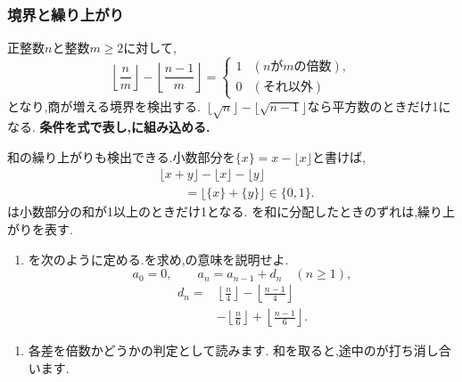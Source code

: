   \subsubsection{境界と繰り上がり}\label{節：ガウス型の境界と条件}
    正整数$n$と整数$m\ge2$に対して,
    \[
      \left\lfloor\frac nm\right\rfloor-
      \left\lfloor\frac{n-1}{m}\right\rfloor
      =\begin{cases}
         1 & (n\text{が}m\text{の倍数}),\\
         0 & (\text{それ以外})
       \end{cases}
    \]
    となり,商が増える境界を検出する.
    \,$\lfloor\sqrt n\rfloor-\lfloor\sqrt{n-1}\rfloor$なら平方数のときだけ1になる.
    \textbf{条件を式で表し,に組み込める.}

    和の繰り上がりも検出できる.小数部分を$\{x\}=x-\lfloor x\rfloor$と書けば,
    \begin{align*}
      &\lfloor x+y\rfloor-\lfloor x\rfloor-\lfloor y\rfloor\\
      &\qquad=\lfloor\{x\}+\{y\}\rfloor\in\{0,1\}.
    \end{align*}
    は小数部分の和が1以上のときだけ1となる.
    を和に分配したときのずれは,繰り上がりを表す.

    \noindent {}\par\nobreak
    \begin{enumerate}[label=(\arabic*),parsep=3pt,beginpenalty=10000,format=\bookitemlink{example-gauss-role-4}{problem}{answer}]
      \item {}を次のように定める.を求め,の意味を説明せよ.
            \[
              a_0=0,\qquad a_n=a_{n-1}+d_n\quad(n\ge1),
            \]
            \[
              \begin{aligned}
                d_n={}&\left\lfloor\frac n4\right\rfloor
                       -\left\lfloor\frac{n-1}{4}\right\rfloor\\
                      &-\left\lfloor\frac n6\right\rfloor
                       +\left\lfloor\frac{n-1}{6}\right\rfloor.
              \end{aligned}
            \]
    \end{enumerate}

    \noindent {}\par\nobreak
    \begin{enumerate}[label=(\arabic*),parsep=3pt,beginpenalty=10000,format=\bookitemlink{example-gauss-role-4}{hint}{problem}]
      \item 各差を倍数かどうかの判定として読みます.
            和を取ると,途中のが打ち消し合います.
    \end{enumerate}

